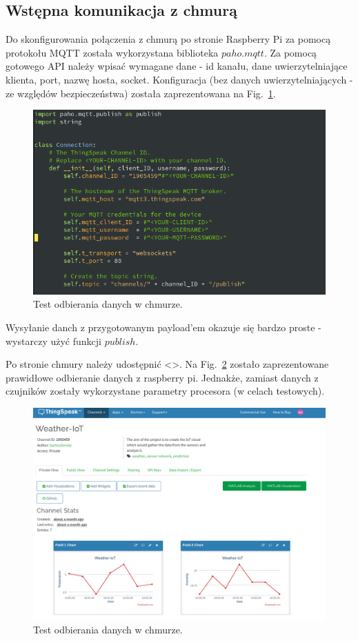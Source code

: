 \documentclass[runningheads]{llncs}
\begin{document}
\subsection{Wstępna komunikacja z chmurą}
Do skonfigurowania połączenia z chmurą po stronie Raspberry Pi za pomocą protokołu MQTT została wykorzystana biblioteka $paho.mqtt$.
Za pomocą gotowego API należy wpisać wymagane dane - id kanału, dane uwierzytelniające klienta, port, nazwę hosta, socket.
Konfiguracja (bez danych uwierzytelniających - ze względów bezpieczeństwa) została zaprezentowana na Fig.~\ref{fig1}.
\begin{figure}
  \centering
  \includegraphics[width=\textwidth]{kod.png}
  \caption{Test odbierania danych w chmurze.} \label{fig1}    
\end{figure}

Wysyłanie danch z przygotowanym payload'em okazuje się bardzo proste - wystarczy użyć funkcji $publish$.

Po stronie chmury należy udostępnić <>. Na Fig.~\ref{fig2} zostało zaprezentowane prawidłowe odbieranie danych z raspberry pi. Jednakże, zamiast danych z czujników zostały wykorzystane parametry procesora (w celach testowych).
\begin{figure}
  \centering
  \includegraphics[width=\textwidth]{chumra.png}
  \caption{Test odbierania danych w chmurze.} \label{fig2}    
\end{figure}
\end{document}
